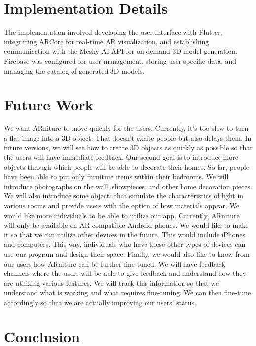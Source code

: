 \documentclass[12pt, a4paper]{article}
\begin{document}
\section{Implementation Details}
The implementation involved developing the user interface with Flutter, integrating ARCore for real-time AR visualization, and establishing communication with the Meshy AI API for on-demand 3D model generation. Firebase was configured for user management, storing user-specific data, and managing the catalog of generated 3D models.

\section{Future Work}

We want ARniture to move quickly for the users. Currently, it's too slow to turn a flat image into a 3D object. That doesn't excite people but also delays them. In future versions, we will see how to create 3D objects as quickly as possible so that the users will have immediate feedback. Our second goal is to introduce more objects through which people will be able to decorate their homes. So far, people have been able to put only furniture items within their bedrooms. We will introduce photographs on the wall, showpieces, and other home decoration pieces. We will also introduce some objects that simulate the characteristics of light in various rooms and provide users with the option of how materials appear. We would like more individuals to be able to utilize our app. Currently, ARniture will only be available on AR-compatible Android phones. We would like to make it so that we can utilize other devices in the future. This would include iPhones and computers. This way, individuals who have these other types of devices can use our program and design their space. Finally, we would also like to know from our users how ARniture can be further fine-tuned. We will have feedback channels where the users will be able to give feedback and understand how they are utilizing various features. We will track this information so that we understand what is working and what requires fine-tuning. We can then fine-tune accordingly so that we are actually improving our users' status.

\section{Conclusion}
\end{document}
